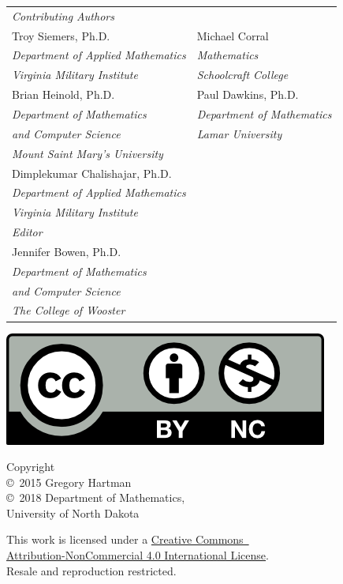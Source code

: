 
\noindent\hspace{-1in}\begin{tabular}{ll}
\textit{Contributing Authors}\\
Troy Siemers, Ph.D. & Michael Corral\\
\emph{\small Department of Applied Mathematics}\qquad\qquad\null & \emph{\small Mathematics}\\
\emph{\small Virginia Military Institute} &
\emph{\small Schoolcraft College}\bigskip\\
Brian Heinold, Ph.D. & Paul Dawkins, Ph.D.\\
\emph{\small Department of Mathematics} & \emph{\small Department of Mathematics}\\
\emph{\small and Computer Science} & \emph{\small Lamar University} \\
\emph{\small Mount Saint Mary's University}\bigskip\\
Dimplekumar Chalishajar, Ph.D.\\
\emph{\small Department of Applied Mathematics}\\
\emph{\small Virginia Military Institute}\bigskip\medskip\\
\textit{Editor}\\
Jennifer Bowen, Ph.D.\\
\emph{\small Department of Mathematics}\\
\emph{\small and Computer Science}\\
\emph{\small The College of Wooster}
\end{tabular}


\noindent\hspace{-1in}\begin{minipage}{2in}
\href{http://creativecommons.org/licenses/by-nc/4.0/}{\includegraphics{figures/by-nc}}
\end{minipage}%
\begin{minipage}{3in}\raggedright
\noindent Copyright\\
\copyright~2015 Gregory Hartman\\
\copyright~2018 Department of Mathematics,\\
University of North Dakota

This work is licensed under a \href{http://creativecommons.org/licenses/by-nc/4.0/}{Creative Commons\iflatexml\ \else\\\fi Attribution-NonCommercial 4.0 International License}.\\
Resale and reproduction restricted.
\end{minipage}

